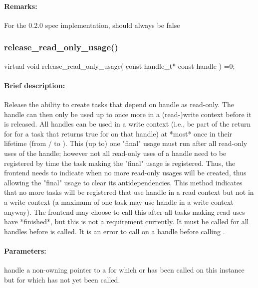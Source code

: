 \paragraph{Remarks:} For the 0.2.0 spec implementation,  should always be false


\subsubsection{release\_read\_only\_usage()}
\begin{CppCode}
    virtual void
    release_read_only_usage(
      const handle_t* const handle
    ) =0;
\end{CppCode}

\paragraph{Brief description:} Release the ability to create tasks that depend on handle as read-only.  The handle can
     then only be used up to once more in a (read-)write context before it is released.
     All handles can be used in a write context (i.e., be part of the return for 
       for a task that returns true for  on that handle) at *most* once in their lifetime
       (from / to ).  This (up to) one "final"
       usage must run after all read-only uses of the handle; however not all read-only uses of
       a handle need to be registered by time the task making the "final" usage is registered.  Thus,
       the frontend needs to indicate when no more read-only usages will be created, thus allowing
       the "final" usage to clear its antidependencies.
       This method indicates that no more tasks will be registered that use handle in a read context
       but not in a write context (a maximum of one task may use handle in a write context anyway).
       The frontend may choose to call this after all tasks making read uses have *finished*, but this
       is not a requirement currently.  It must be called for all handles before  is
       called.  It is an error to call  on a handle before calling .
     
\paragraph{Parameters:}
\begin{compactdesc} 
\item[handle] a non-owning pointer to a  for which  or
      has been called on this instance but for which  has not
       yet been called.
\end{compactdesc}


